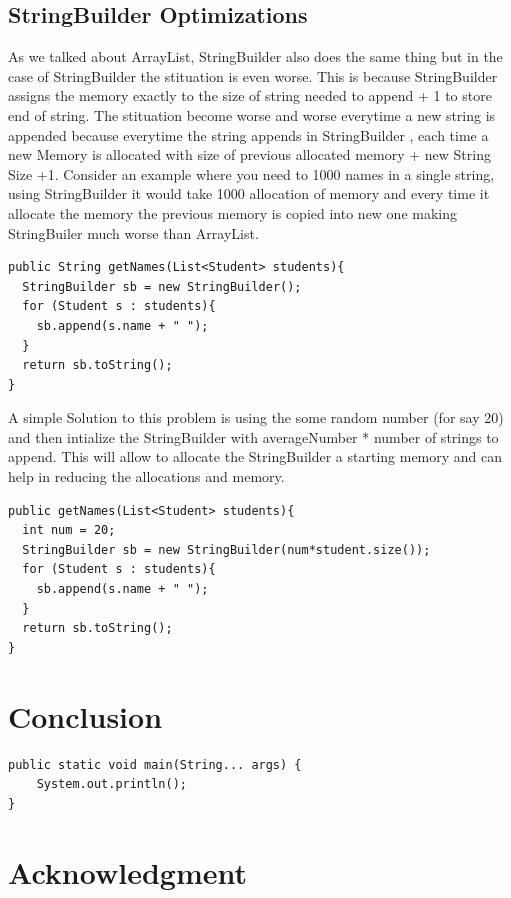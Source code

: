 \documentclass[journal]{IEEEtran}
\begin{document}
\subsection{StringBuilder Optimizations}
As we talked about ArrayList, StringBuilder also does the same thing but in the case of StringBuilder the stituation is even worse. This is because StringBuilder assigns the memory exactly to the size of string needed to append + 1 to store end of string. The stituation become worse and worse everytime a new string is appended because everytime the string appends in StringBuilder , each time a new Memory is allocated with size of previous allocated memory + new String Size +1. Consider an example where you need to 1000 names in a single string, using StringBuilder it would take 1000 allocation of memory and every time it allocate the memory the previous memory is copied into new one making StringBuiler much worse than ArrayList.
\begin{verbatim}
public String getNames(List<Student> students){
  StringBuilder sb = new StringBuilder();
  for (Student s : students){
    sb.append(s.name + " ");
  }
  return sb.toString();
}
\end{verbatim}
A simple Solution to this problem is using the some random number (for say 20) and then intialize the StringBuilder with averageNumber * number of strings to append. This will allow to allocate the StringBuilder a starting memory and can help in reducing the allocations and memory.
\begin{verbatim}
public getNames(List<Student> students){
  int num = 20;
  StringBuilder sb = new StringBuilder(num*student.size());
  for (Student s : students){
    sb.append(s.name + " ");
  }
  return sb.toString();
}
\end{verbatim}

\section{Conclusion}
\blindtext

\begin{verbatim}
public static void main(String... args) {
    System.out.println();
}
\end{verbatim}

\section*{Acknowledgment}
\end{document}
